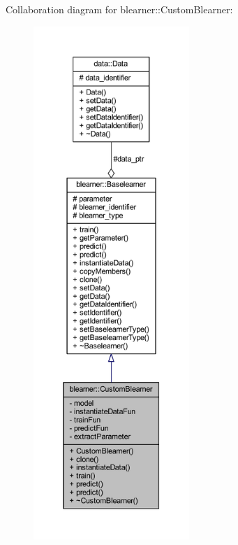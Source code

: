Collaboration diagram for blearner\+:\+:Custom\+Blearner\+:\nopagebreak
\begin{figure}[H]
\begin{center}
\leavevmode
\includegraphics[height=550pt]{classblearner_1_1_custom_blearner__coll__graph}
\end{center}
\end{figure}
